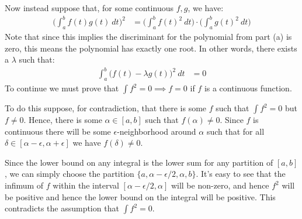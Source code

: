 \documentclass[letterpaper,10pt]{article}
\begin{document}
\begin{enumerate}
\begin{enumerate}[a)]
		Now instead suppose that, for some continuous $f, g$, we have:
		\begin{align*}
		  \Bigg( \int_{a}^{b} f(t)g(t)\ dt \Bigg)^2 & = \Bigg( \int_{a}^{b} f(t)^2\ dt \Bigg) \cdot \Bigg( \int_{a}^{b} g(t)^2 \ dt \Bigg) 
		\end{align*}
		Note that since this implies the discriminant for the polynomial from part (a) is zero, this means the polynomial has exactly one root. In other words, there exists a $\lambda$ such that:
		\begin{align*}
		  \int_{a}^{b} \big( f(t) - \lambda g(t) \big)^2 \ dt &= 0
		\end{align*}
		To continue we must prove that $\int f^2 = 0 \implies f = 0$ if $f$ is a continuous function. 

		To do this suppose, for contradiction, that there is some $f$ such that $\int f^2 = 0$ but $f \neq 0$. Hence, there is some $\alpha \in [a, b]$ such that $f(\alpha) \neq 0$. Since $f$ is continuous there will be some $\epsilon$-neighborhood around $\alpha$ such that for all $\delta \in [\alpha - \epsilon, \alpha + \epsilon]$ we have $f(\delta) \neq 0$.

		Since the lower bound on any integral is the lower sum for any partition of $[a, b]$, we can simply choose the partition $\{a, \alpha - \epsilon/2, \alpha, b\}$.	It's easy to see that the infimum of $f$ within the interval $[\alpha - \epsilon/2, \alpha]$ will be non-zero, and hence $f^2$ will be positive and hence the lower bound on the integral will be positive. This contradicts the assumption that $\int f^2 = 0$.


\end{enumerate}
\end{enumerate}
\end{document}
